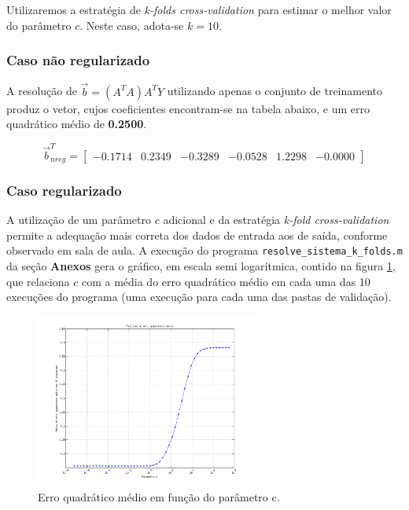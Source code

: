 \vspace{12pt}

Utilizaremos a estratégia de \textit{k-folds cross-validation} para estimar o
melhor valor do parâmetro \(c\). Neste caso, adota-se \(k=10\).

\subsubsection{Caso não regularizado}

A resolução de \(\overrightarrow{b} = \left( A^T A \right) A^T
Y\) utilizando apenas o conjunto de treinamento produz o vetor, cujos
coeficientes encontram-se na tabela abaixo, e um erro quadrático médio de
\textbf{0.2500}.

\[
\overrightarrow{b}_{nreg}^T = \begin{bmatrix}
  -0.1714 & 0.2349 & -0.3289 & -0.0528 & 1.2298 & -0.0000
  \end{bmatrix}
\]

\FloatBarrier
\subsubsection{Caso regularizado}

A utilização de um parâmetro \(c\) adicional e da estratégia \textit{k-fold
cross-validation} permite a adequação mais correta dos dados de entrada aos de
saída, conforme observado em sala de aula. A execução do programa
\texttt{resolve\_sistema\_k\_folds.m} da seção \textbf{Anexos} gera o gráfico,
em escala semi logarítmica, contido na figura \ref{fig:pred.regula}, que
relaciona \(c\) com a média do erro quadrático médio em cada uma das 10
execuções do programa (uma execução para cada uma das pastas de validação).

	\begin{figure}[H]
	  \centering
	  \includegraphics[width=0.65\textwidth]{image/preditor_regularizado_k_folds}
	  \caption{Erro quadrático médio em função do parâmetro c.} 
	  \label{fig:pred.regula}
	\end{figure}
	
